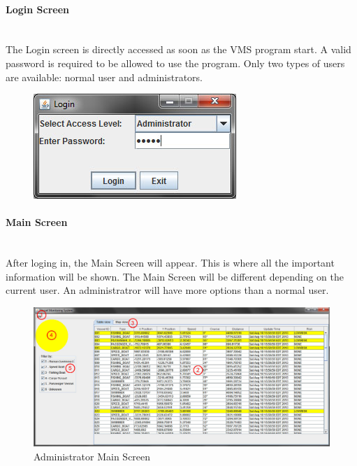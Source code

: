 \documentclass{article}
\begin{document}
\paragraph{Login Screen \\ \\}
The Login screen is directly accessed as soon as the VMS program start. A valid password is required to be allowed to use the program. Only two types of users are available: normal user and administrators.%

	\begin{figure}[!htb]
	\centering
	\includegraphics[scale=0.80]{images/userManual1.jpg}
	\end{figure}

\paragraph{Main Screen \\ \\}
After loging in, the Main Screen will appear. This is where all the important information will be shown. The Main Screen will be different depending on the current user. An administratror will have more options than a normal user. 

	\begin{figure}[!htb]
	\caption{Administrator Main Screen}
	\centering
	\includegraphics[scale=0.35]{images/userManual2_admin.jpg}
	\end{figure}
\end{document}
